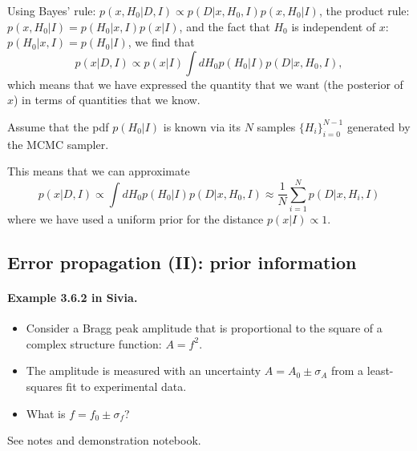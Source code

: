 \documentclass[%
oneside,                 %
final,                   %
10pt]{article}
\begin{document}
Using Bayes' rule: $p(x,H_0|D,I) \propto p(D|x,H_0,I) p(x,H_0|I)$, the product rule: $p(x,H_0|I) = p(H_0|x,I)p(x|I)$, and the fact that $H_0$ is independent of $x$: $p(H_0|x,I) = p(H_0|I)$, we find that
\[
p(x|D,I) \propto p(x|I) \int dH_0 p(H_0|I) p(D|x,H_0,I),
\]
which means that we have expressed the quantity that we want (the posterior of $x$) in terms of quantities that we know.

Assume that the pdf $p(H_0 | I)$ is known via its $N$ samples $\{H_{i}\}_{i=0}^{N-1}$ generated by the MCMC sampler.

This means that we can approximate 
\[
p(x |D,I) \propto \int dH_0 p(H_0|I) p(D|x,H_0,I) \approx \frac{1}{N} \sum_{i=1}^N p(D | x, H_i, I)
\]
where we have used a uniform prior for the distance $p(x|I) \propto 1$.


\subsection{Error propagation (II): prior information}

\paragraph{Example 3.6.2 in Sivia.}
\begin{itemize}
\item Consider a Bragg peak amplitude that is proportional to the square of a complex structure function: $A = f^2$.

\item The amplitude is measured with an uncertainty $A = A_0 \pm \sigma_A$ from a least-squares fit to experimental data.

\item What is $f = f_0 \pm \sigma_f$?
\end{itemize}

\noindent
See notes and demonstration notebook.


\end{document}
